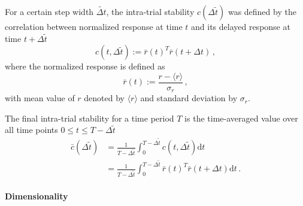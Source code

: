 \documentclass[11pt]{article}
\begin{document}
	For a certain step width $\tilde{\Delta t}$, the intra-trial stability $c(\Delta \tilde{t})$ was defined by the correlation between normalized response at time $t$ and its delayed response at time $t + \Delta \tilde{t}$ 
		\begin{equation}
			c(t, \Delta \tilde{t}) := \bar{r}(t)^T \bar{r}(t + \Delta t) \, , 
		\end{equation}
	where the normalized response is defined as
		\begin{equation}
			\bar{r}(t) := \frac{r - \langle r \rangle}{\sigma_r} \, ,
		\end{equation}
	with mean value of $r$ denoted by $\langle r \rangle$ and standard deviation by $\sigma_r$. 
	
	The final intra-trial stability for a time period $T$ is the time-averaged value over all time points $0 \leq t \leq T - \Delta \tilde{t}$
		\begin{equation} \label{eq:its_sym}
			\begin{split}
				\bar{c}{(\Delta \tilde{t})} &= \frac{1}{T-\Delta \tilde{t}} \int_{0}^{T-\Delta \tilde{t}} c(t, \Delta \tilde{t}) \mathrm{d} t\\
				                            &= \frac{1}{T-\Delta \tilde{t}} \int_{0}^{T-\Delta \tilde{t}} \bar{r}(t)^T \bar{r}(t + \Delta t) \mathrm{d} t \, .
			\end{split} 
		\end{equation}
	
	\paragraph{Dimensionality}
	
\end{document}
